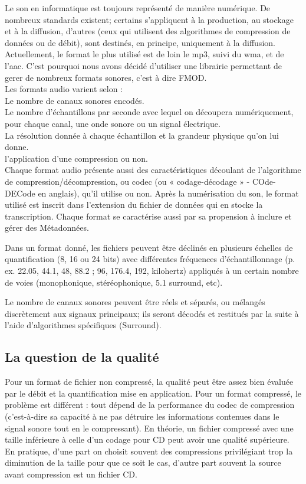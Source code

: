 \documentclass[12pt]{report}
\begin{document}
\newpage

Le son en informatique est toujours représenté de manière numérique. De nombreux standards existent; certains s'appliquent à la production, au stockage et à la diffusion, d'autres (ceux qui utilisent des algorithmes de compression de données ou de débit), sont destinés, en principe, uniquement à la diffusion. Actuellement, le format le plus utilisé est de loin le mp3, suivi du wma, et de l'aac. C'est pourquoi nous avons décidé d'utiliser une librairie permettant de gerer de nombreux formats sonores, c'est à dire FMOD.\\


Les formats audio varient selon :\\

    Le nombre de canaux sonores encodés.\\
  Le nombre d'échantillons par seconde avec lequel on découpera numériquement, pour chaque canal, une onde sonore ou un signal électrique.\\
   La résolution donnée à chaque échantillon et la grandeur physique qu'on lui donne.\\
    l'application d'une compression ou non.\\

Chaque format audio présente aussi des caractéristiques découlant de l'algorithme de compression/décompression, ou codec (ou « codage-décodage » - COde-DECode en anglais), qu'il utilise ou non. Après la numérisation du son, le format utilisé est inscrit dans l'extension du fichier de données qui en stocke la transcription. Chaque format se caractérise aussi par sa propension à inclure et gérer des Métadonnées.

Dans un format donné, les fichiers peuvent être déclinés en plusieurs échelles de quantification (8, 16 ou 24 bits) avec différentes fréquences d'échantillonnage (p. ex. 22.05, 44.1, 48, 88.2 ; 96, 176.4, 192, kilohertz) appliqués à un certain nombre de voies (monophonique, stéréophonique, 5.1 surround, etc).

Le nombre de canaux sonores peuvent être réels et séparés, ou mélangés discrètement aux signaux principaux; ils seront décodés et restitués par la suite à l'aide d'algorithmes spécifiques (Surround).

\newpage
\subsection{La question de la qualité}
Pour un format de fichier non compressé, la qualité peut être assez bien évaluée par le débit et la quantification mise en application. Pour un format compressé, le problème est différent : tout dépend de la performance du codec de compression (c'est-à-dire sa capacité à ne pas détruire les informations contenues dans le signal sonore tout en le compressant). En théorie, un fichier compressé avec une taille inférieure à celle d'un codage pour CD peut avoir une qualité supérieure. En pratique, d'une part on choisit souvent des compressions privilégiant trop la diminution de la taille pour que ce soit le cas, d'autre part souvent la source avant compression est un fichier CD.
\end{document}
